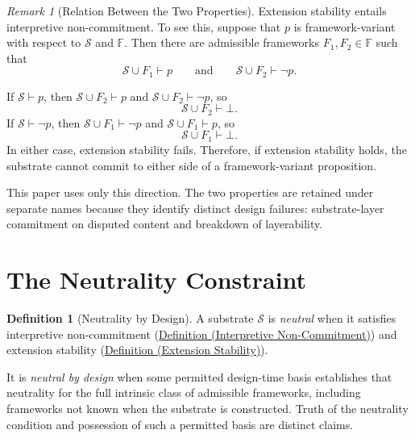 \documentclass[11pt]{article}
\theoremstyle{plain}
\theoremstyle{definition}
\newtheorem{definition}[theorem]{Definition}
\theoremstyle{remark}
\newtheorem{remark}[theorem]{Remark}
\newcommand{\DefRef}[2]{\hyperref[#1]{Definition (#2)}}
\newcommand{\Substrate}{\mathcal{S}}
\newcommand{\Frameworks}{\mathbb{F}}
\newcommand{\FrameworkOne}{F_1}
\newcommand{\FrameworkTwo}{F_2}
\newcommand{\entails}{\vdash}
\begin{document}

\begin{remark}[Relation Between the Two Properties]
  \label{se100.remark.PropertyRelation}
  Extension stability entails interpretive non-commitment.
  To see this, suppose that $p$ is framework-variant with respect to
  $\Substrate$ and $\Frameworks$.
  Then there are admissible frameworks $\FrameworkOne, \FrameworkTwo \in \Frameworks$
  such that
  \[
    \Substrate \cup \FrameworkOne \entails p
    \qquad\text{and}\qquad
    \Substrate \cup \FrameworkTwo \entails \neg p .
  \]

  If $\Substrate \entails p$, then
  $\Substrate \cup \FrameworkTwo \entails p$
  and
  $\Substrate \cup \FrameworkTwo \entails \neg p$,
  so
  \[
    \Substrate \cup \FrameworkTwo \entails \bot .
  \]
  If $\Substrate \entails \neg p$, then
  $\Substrate \cup \FrameworkOne \entails \neg p$
  and
  $\Substrate \cup \FrameworkOne \entails p$,
  so
  \[
    \Substrate \cup \FrameworkOne \entails \bot .
  \]
  In either case, extension stability fails.
  Therefore, if extension stability holds, the substrate cannot commit to
  either side of a framework-variant proposition.

  This paper uses only this direction.
  The two properties are retained under separate names because they identify
  distinct design failures:
  substrate-layer commitment on disputed content and breakdown of layerability.
\end{remark}

\section{The Neutrality Constraint}
\label{sec:neutrality}

\begin{definition}[Neutrality by Design]
  \label{se100.def.NeutralityByDesign}
  A substrate $\Substrate$ is \emph{neutral}
  when it satisfies interpretive non-commitment
  (\DefRef{se100.def.InterpretiveNonCommitment}{Interpretive Non-Commitment})
  and extension stability
  (\DefRef{se100.def.ExtensionStability}{Extension Stability}).

  It is \emph{neutral by design} when some permitted
  design-time basis establishes that neutrality for the full
  intrinsic class of admissible frameworks, including frameworks
  not known when the substrate is constructed.
  Truth of the neutrality condition and possession of such a
  permitted basis are distinct claims.
\end{definition}
\end{document}
